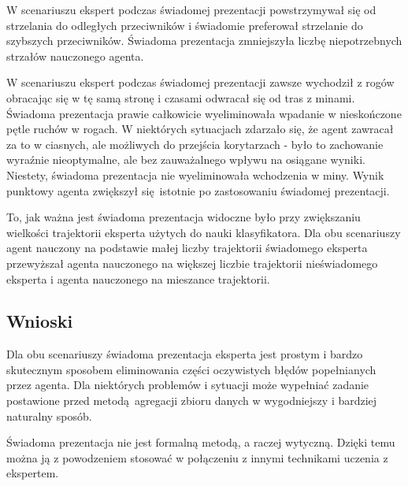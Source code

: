 W scenariuszu  ekspert podczas świadomej prezentacji powstrzymywał się od strzelania do odległych przeciwników i świadomie preferował strzelanie do szybszych przeciwników. Świadoma prezentacja zmniejszyła liczbę niepotrzebnych strzałów nauczonego agenta.

W scenariuszu  ekspert podczas świadomej prezentacji zawsze wychodził z rogów obracając się w tę samą stronę i czasami odwracał się od tras z minami. Świadoma prezentacja prawie całkowicie wyeliminowała wpadanie w nieskończone pętle ruchów w rogach. W niektórych sytuacjach zdarzało się, że agent zawracał za to w ciasnych, ale możliwych do przejścia korytarzach - było to zachowanie wyraźnie nieoptymalne, ale bez zauważalnego wpływu na osiągane wyniki. Niestety, świadoma prezentacja nie wyeliminowała wchodzenia w miny. Wynik punktowy agenta zwiększył się istotnie po zastosowaniu świadomej prezentacji.

To, jak ważna jest świadoma prezentacja widoczne było przy zwiększaniu wielkości trajektorii eksperta użytych do nauki klasyfikatora. Dla obu scenariuszy agent nauczony na podstawie małej liczby trajektorii świadomego eksperta przewyższał agenta nauczonego na większej liczbie trajektorii nieświadomego eksperta i agenta nauczonego na mieszance trajektorii. 
 
\subsection{Wnioski}

Dla obu scenariuszy świadoma prezentacja eksperta jest prostym i bardzo skutecznym sposobem eliminowania części oczywistych błędów popełnianych przez agenta. Dla niektórych problemów i sytuacji może wypełniać zadanie postawione przed metodą agregacji zbioru danych w wygodniejszy i bardziej naturalny sposób.

Świadoma prezentacja nie jest formalną metodą, a raczej wytyczną. Dzięki temu można ją z powodzeniem stosować w połączeniu z innymi technikami uczenia z ekspertem.
